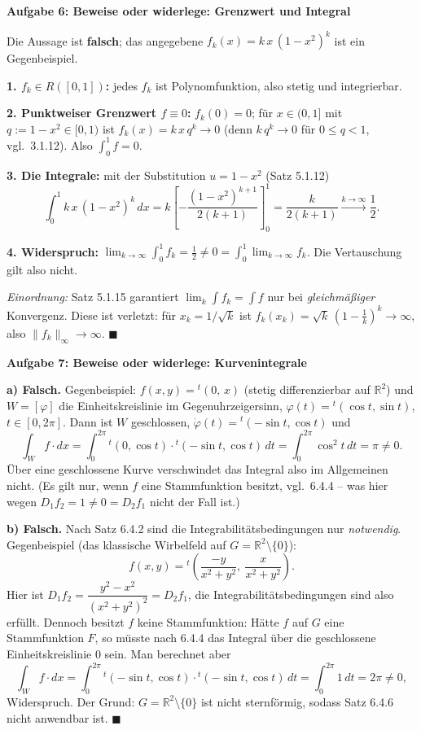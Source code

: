 \documentclass[a4paper,12pt]{article}
\providecommand{\qed}{\hfill\ensuremath{\blacksquare}}
\newcommand{\aufgabe}[2]{%
  \bigskip\par\noindent\textbf{Aufgabe #1: #2}\par\nobreak\medskip}
\begin{document}
\aufgabe{6}{Beweise oder widerlege: Grenzwert und Integral}

Die Aussage ist \textbf{falsch}; das angegebene $f_k(x)=k\,x\,(1-x^2)^k$ ist ein Gegenbeispiel.

\textbf{1. $f_k\in R([0,1])$:} jedes $f_k$ ist Polynomfunktion, also stetig und integrierbar.

\textbf{2. Punktweiser Grenzwert $f\equiv0$:} $f_k(0)=0$; für $x\in(0,1]$ mit $q:=1-x^2\in[0,1)$ ist $f_k(x)=k\,x\,q^k\to0$ (denn $k\,q^k\to0$ für $0\le q<1$, vgl.\ 3.1.12). Also $\int_0^1 f=0$.

\textbf{3. Die Integrale:} mit der Substitution $u=1-x^2$ (Satz 5.1.12)
\[
\int_0^1 k\,x\,(1-x^2)^k\,dx=k\left[-\frac{(1-x^2)^{k+1}}{2(k+1)}\right]_0^1=\frac{k}{2(k+1)}\xrightarrow{k\to\infty}\frac12.
\]

\textbf{4. Widerspruch:} $\displaystyle\lim_{k\to\infty}\int_0^1 f_k=\frac12\neq0=\int_0^1\lim_{k\to\infty}f_k$. Die Vertauschung gilt also nicht.

\emph{Einordnung:} Satz 5.1.15 garantiert $\lim_k\int f_k=\int f$ nur bei \emph{gleichmäßiger} Konvergenz. Diese ist verletzt: für $x_k=1/\sqrt k$ ist $f_k(x_k)=\sqrt k\,(1-\tfrac1k)^k\to\infty$, also $\|f_k\|_\infty\to\infty$. \qed

\aufgabe{7}{Beweise oder widerlege: Kurvenintegrale}

\textbf{a) Falsch.} Gegenbeispiel: $f(x,y)={}^t(0,\,x)$ (stetig differenzierbar auf $\mathbb{R}^2$) und $W=[\varphi]$ die Einheitskreislinie im Gegenuhrzeigersinn, $\varphi(t)={}^t(\cos t,\sin t)$, $t\in[0,2\pi]$. Dann ist $W$ geschlossen, $\dot\varphi(t)={}^t(-\sin t,\cos t)$ und
\[
\int_W f\cdot dx=\int_0^{2\pi}{}^t(0,\cos t)\cdot{}^t(-\sin t,\cos t)\,dt=\int_0^{2\pi}\cos^2 t\,dt=\pi\neq0.
\]
Über eine geschlossene Kurve verschwindet das Integral also im Allgemeinen nicht. (Es gilt nur, wenn $f$ eine Stammfunktion besitzt, vgl.\ 6.4.4 -- was hier wegen $D_1f_2=1\neq0=D_2f_1$ nicht der Fall ist.)

\textbf{b) Falsch.} Nach Satz 6.4.2 sind die Integrabilitätsbedingungen nur \emph{notwendig}. Gegenbeispiel (das klassische Wirbelfeld auf $G=\mathbb{R}^2\setminus\{0\}$):
\[
f(x,y)={}^t\!\left(\frac{-y}{x^2+y^2},\ \frac{x}{x^2+y^2}\right).
\]
Hier ist $D_1f_2=\dfrac{y^2-x^2}{(x^2+y^2)^2}=D_2f_1$, die Integrabilitätsbedingungen sind also erfüllt. Dennoch besitzt $f$ keine Stammfunktion: Hätte $f$ auf $G$ eine Stammfunktion $F$, so müsste nach 6.4.4 das Integral über die geschlossene Einheitskreislinie $0$ sein. Man berechnet aber
\[
\int_W f\cdot dx=\int_0^{2\pi}{}^t(-\sin t,\cos t)\cdot{}^t(-\sin t,\cos t)\,dt=\int_0^{2\pi}1\,dt=2\pi\neq0,
\]
Widerspruch. Der Grund: $G=\mathbb{R}^2\setminus\{0\}$ ist nicht sternförmig, sodass Satz 6.4.6 nicht anwendbar ist. \qed
\end{document}

